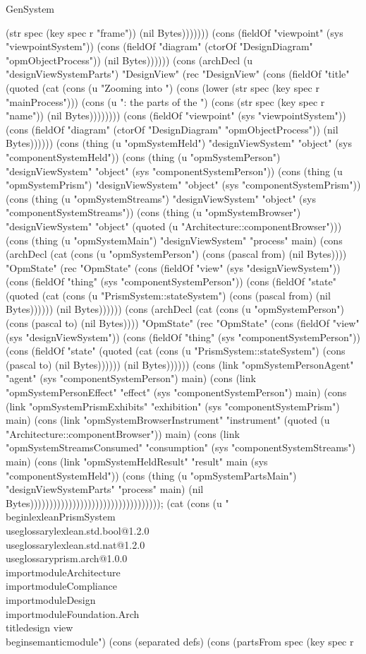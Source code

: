 \begin{lexlean}{GenSystem}
\begin{semanticmodule}
{{(str spec (key spec r "frame")) (nil Bytes))))))) (cons (fieldOf "viewpoint" (sys "viewpointSystem")) (cons (fieldOf "diagram" (ctorOf "DesignDiagram" "opmObjectProcess")) (nil Bytes)))))) (cons (archDecl (u "designViewSystemParts") "DesignView" (rec "DesignView" (cons (fieldOf "title" (quoted (cat (cons (u "Zooming into ") (cons (lower (str spec (key spec r "mainProcess"))) (cons (u ": the parts of the ") (cons (str spec (key spec r "name")) (nil Bytes)))))))) (cons (fieldOf "viewpoint" (sys "viewpointSystem")) (cons (fieldOf "diagram" (ctorOf "DesignDiagram" "opmObjectProcess")) (nil Bytes)))))) (cons (thing (u "opmSystemHeld") "designViewSystem" "object" (sys "componentSystemHeld")) (cons (thing (u "opmSystemPerson") "designViewSystem" "object" (sys "componentSystemPerson")) (cons (thing (u "opmSystemPrism") "designViewSystem" "object" (sys "componentSystemPrism")) (cons (thing (u "opmSystemStreams") "designViewSystem" "object" (sys "componentSystemStreams")) (cons (thing (u "opmSystemBrowser") "designViewSystem" "object" (quoted (u "Architecture::componentBrowser"))) (cons (thing (u "opmSystemMain") "designViewSystem" "process" main) (cons (archDecl (cat (cons (u "opmSystemPerson") (cons (pascal from) (nil Bytes)))) "OpmState" (rec "OpmState" (cons (fieldOf "view" (sys "designViewSystem")) (cons (fieldOf "thing" (sys "componentSystemPerson")) (cons (fieldOf "state" (quoted (cat (cons (u "PrismSystem::stateSystem") (cons (pascal from) (nil Bytes)))))) (nil Bytes)))))) (cons (archDecl (cat (cons (u "opmSystemPerson") (cons (pascal to) (nil Bytes)))) "OpmState" (rec "OpmState" (cons (fieldOf "view" (sys "designViewSystem")) (cons (fieldOf "thing" (sys "componentSystemPerson")) (cons (fieldOf "state" (quoted (cat (cons (u "PrismSystem::stateSystem") (cons (pascal to) (nil Bytes)))))) (nil Bytes)))))) (cons (link "opmSystemPersonAgent" "agent" (sys "componentSystemPerson") main) (cons (link "opmSystemPersonEffect" "effect" (sys "componentSystemPerson") main) (cons (link "opmSystemPrismExhibits" "exhibition" (sys "componentSystemPrism") main) (cons (link "opmSystemBrowserInstrument" "instrument" (quoted (u "Architecture::componentBrowser")) main) (cons (link "opmSystemStreamsConsumed" "consumption" (sys "componentSystemStreams") main) (cons (link "opmSystemHeldResult" "result" main (sys "componentSystemHeld")) (cons (thing (u "opmSystemPartsMain") "designViewSystemParts" "process" main) (nil Bytes)))))))))))))))))))))))))))))))))); (cat (cons (u "\\begin{lexlean}{PrismSystem}\n\\useglossary{lexlean.std.bool@1.2.0}\n\\useglossary{lexlean.std.nat@1.2.0}\n\\useglossary{prism.arch@1.0.0}\n\\importmodule{Architecture}\n\\importmodule{Compliance}\n\\importmodule{Design}\n\\importmodule{Foundation.Arch}\n\\title{design view}\n\\begin{semanticmodule}\n") (cons (separated defs) (cons (partsFrom spec (key spec r }}
\end{semanticmodule}
\end{lexlean}
